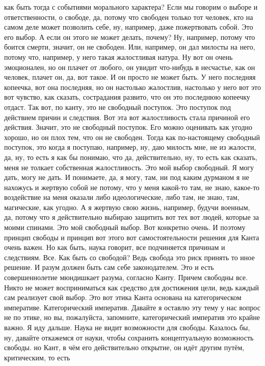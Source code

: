 как быть тогда с событиями морального характера? Если мы говорим о выборе и
ответственности, о свободе, да, потому что свободен только тот человек, кто на
самом деле может позволить себе, ну, например, даже пожертвовать собой. Это его
выбор. А если он этого не может делать, почему? Ну, например, потому что боится
смерти, значит, он не свободен. Или, например, он дал милосты на него, потому
что, например, у него такая жалостливая натура. Ну вот он очень эмоционален, но
он плачет от любого, он увидит что-нибудь в несчастье, как он человек, плачет
он, да, вот такое. И он просто не может быть. У него последняя копеечка, вот она
последняя, но он настолько жалостлив, настолько у него вот это вот чувство, как
сказать, сострадания развито, что он это последнюю копеечку отдаст. Так вот, по
канту, это не свободный поступок. Это поступок под действием причин и следствия.
Вот эта вот жалостливость стала причиной его действия. Значит, это не свободный
поступок. Его можно оценивать как угодно хорошо, но он плох тем, что он не
свободен. Тогда как по-настоящему свободный поступок, это когда я поступаю,
например, ну, даю милость мне, не из жалости, да, ну, то есть я как бы понимаю,
что да, действительно, ну, то есть как сказать, меня не толкает собственная
жалостливость. Это мой выбор свободный. Я могу дать, могу не дать. И понимаете,
да, я могу, там, ни под каким дурманом я не нахожусь и жертвую собой не потому,
что у меня какой-то там, не знаю, какое-то воздействие на меня оказали либо
идеологические, либо там, не знаю, там, магические, как угодно. А я жертвую свою
жизнь, например, будучи военным, да, потому что я действительно выбираю защитить
вот тех вот людей, которые за моими спинами. Это мой свободный выбор. Вот
конкретно очень. И поэтому принцип свободы и принцип вот этого вот
самостоятельности решения для Канта очень важен. Но как быть, наука говорит, все
подчиняется причинам и следствиям. Все. Как быть со свободой? Ведь свобода это
риск принять то иное решение. И разум должен быть сам себе законодателем. Это и
есть совершеннолетие мюндишкает разума, согласно Канту. Причем свободны все.
Никто не может восприниматься как средство для достижения цели, ведь каждый сам
реализует свой выбор. Это вот этика Канта основана на категорическом императиве.
Категорический императив. Давайте я оставлю эту тему у нас вопрос не по этике,
но вы, пожалуйста, запомните, категорический императив это крайне важно. Я иду
дальше. Наука не видит возможности для свободы. Казалось бы, ну, давайте
откажемся от науки, чтобы сохранить концептуальную возможность свободы. но Кант,
в чём его действительно открытие, он идёт другим путём, критическим, то есть
